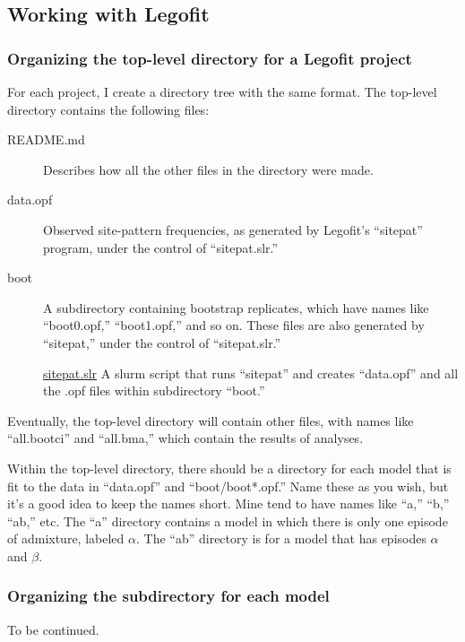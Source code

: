 \documentclass[11pt]{article}
\begin{document}
\subsection{Working with Legofit}
\subsubsection{Organizing the top-level directory for a Legofit project}

For each project, I create a directory tree with the same format.  The
top-level directory contains the following files:
\begin{description}
\item[README.md]
Describes how all the other files in the directory were made.

\item[data.opf]
Observed site-pattern frequencies, as generated by Legofit's
``sitepat'' program, under the control of ``sitepat.slr.''

\item[boot]
A subdirectory containing bootstrap replicates, which have names
like ``boot0.opf,'' ``boot1.opf,'' and so on. These files are also
generated by ``sitepat,'' under the control of ``sitepat.slr.''

\href{sitepat.slr.html}{sitepat.slr}
A slurm script that runs ``sitepat'' and creates ``data.opf'' and all
the .opf files within subdirectory ``boot.''
\end{description}
Eventually, the top-level directory will contain other files, with
names like ``all.bootci'' and ``all.bma,'' which contain the results
of analyses.

Within the top-level directory, there should be a directory for each
model that is fit to the data in ``data.opf'' and ``boot/boot*.opf.''
Name these as you wish, but it's a good idea to keep the names
short. Mine tend to have names like ``a,'' ``b,'' ``ab,'' etc. The
``a'' directory contains a model in which there is only one episode of
admixture, labeled $\alpha$. The ``ab'' directory is for a model that
has episodes $\alpha$ and $\beta$.

\subsubsection{Organizing the subdirectory for each model}

To be continued.

\printbibliography
\end{document}

